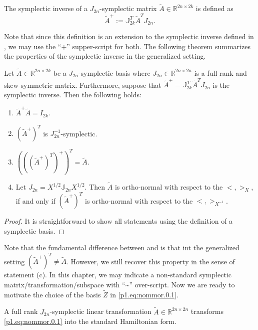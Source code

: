 \begin{definition}
The symplectic inverse of a $J_{2n}$-symplectic matrix $\tilde A\in \mathbb R^{2n\times 2k}$ is defined as
\begin{equation} \label{p1.eq:nommor.0.4}
	\tilde A^{+} := \mathbb J_{2k}^T \tilde A^T J_{2n}.
\end{equation}
\end{definition}
Note that since this definition is an extension to the symplectic inverse defined in , we may use the ``$+$'' supper-script for both. The following theorem summarizes the properties of the symplectic inverse in the generalized setting.

\begin{proposition} \label{thm:2}
Let $\tilde A\in \mathbb R^{2n\times 2k}$ be a $J_{2n}$-symplectic basis where $J_{2n}\in\mathbb R^{2n\times 2n}$ is a full rank and skew-symmetric matrix. Furthermore, suppose that $\tilde A^{+} = \mathbb{J}_{2k}^T \tilde A^T J_{2n}$ is the symplectic inverse. Then the following holds:
\begin{enumerate} [label=(\alph*)]
\item $\tilde A^+ \tilde A = I_{2k}$.
\item $(\tilde A^+)^T$ is $J_{2n}^{-1}$-symplectic.
\item $\left(\left(\left(\tilde A^+\right)^T\right)^+\right)^T = \tilde A$.
\item Let $J_{2n}=X^{1/2}\mathbb J_{2n} X^{1/2}$. Then $\tilde A$ is ortho-normal with respect to the $<,>_X$, if and only if $(\tilde A^+)^T$ is ortho-normal with respect to the $<,>_{X^{-1}}$.
\end{enumerate}
\end{proposition}
\begin{proof}
It is straightforward to show all statements using the definition of a symplectic basis.
\end{proof}

Note that the fundamental difference between  and  is that int the generalized setting $(\tilde A^+)^T \neq \tilde A$. However, we still recover this property in the sense of statement (c). In this chapter, we may indicate a non-standard symplectic matrix/transformation/subspace with ``\textasciitilde'' over-script. Now we are ready to motivate the choice of the basis $\tilde Z$ in \eqref{p1.eq:nommor.0.1}.

\begin{lemma} \label{thm:2.1}
A full rank $J_{2n}$-symplectic linear transformation $\tilde A \in \mathbb R^{2n\times 2n}$ transforms \eqref{p1.eq:nommor.0.1} into the standard Hamiltonian form. 
\end{lemma}

